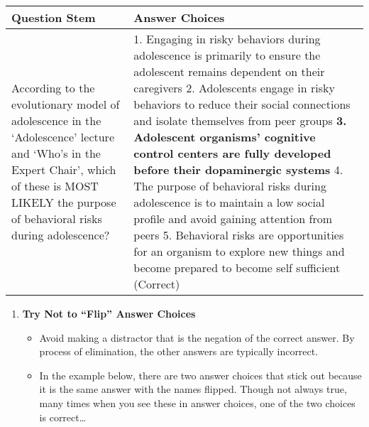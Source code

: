 \documentclass[
]{article}
\providecommand{\tightlist}{%
  \setlength{\itemsep}{0pt}\setlength{\parskip}{0pt}}
\begin{document}
\begin{longtable}[]{@{}ll@{}}
\toprule
\begin{minipage}[b]{0.30\columnwidth}\raggedright
\textbf{Question Stem}\strut
\end{minipage} & \begin{minipage}[b]{0.64\columnwidth}\raggedright
\textbf{Answer Choices}\strut
\end{minipage}\tabularnewline
\midrule
\endhead
\begin{minipage}[t]{0.30\columnwidth}\raggedright
According to the evolutionary model of adolescence in the `Adolescence' lecture and `Who's in the Expert Chair', which of these is MOST LIKELY the purpose of behavioral risks during adolescence?\strut
\end{minipage} & \begin{minipage}[t]{0.64\columnwidth}\raggedright
1. Engaging in risky behaviors during adolescence is primarily to ensure the adolescent remains dependent on their caregivers 2. Adolescents engage in risky behaviors to reduce their social connections and isolate themselves from peer groups \textbf{3. Adolescent organisms' cognitive control centers are fully developed before their dopaminergic systems} 4. The purpose of behavioral risks during adolescence is to maintain a low social profile and avoid gaining attention from peers 5. Behavioral risks are opportunities for an organism to explore new things and become prepared to become self sufficient (Correct)\strut
\end{minipage}\tabularnewline
\bottomrule
\end{longtable}

\begin{enumerate}
\def\labelenumi{\arabic{enumi}.}
\setcounter{enumi}{6}
\tightlist
\item
  \textbf{Try Not to ``Flip'' Answer Choices}

  \begin{itemize}
  \tightlist
  \item
    Avoid making a distractor that is the negation of the correct answer. By process of elimination, the other answers are typically incorrect.
  \item
    In the example below, there are two answer choices that stick out because it is the same answer with the names flipped. Though not always true, many times when you see these in answer choices, one of the two choices is correct\ldots{}
  \end{itemize}
\end{enumerate}
\end{document}
